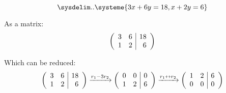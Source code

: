 \documentclass[12pt]{article}
\newenvironment{abc}{\begin{enumerate}[label={\bf(\alph*)}]}{\end{enumerate}}
\newcommand\m[2][]{
	\ifthenelse{\equal {#1} {}}
		{\begin{pmatrix*}[r]#2\end{pmatrix*}}
		{\left(\begin{array}{#1}#2\end{array}\right)}
}
\newcommand\resetequation[1][1]{\setcounter{equation}{#1 - 1}}
\begin{document}
\begin{abc}
	\begin{item}
	\resetequation
	\begin{equation}
		\sysdelim..\systeme{3x + 6y = 18, x + 2y = 6}
	\end{equation}
	\end{item}

	As a matrix:
	\begin{equation}
		\m[rr|r]{3 & 6 & 18 \\ 1 & 2 & 6}
	\end{equation}

	Which can be reduced:
	\begin{equation}
		\m[rr|r]{3 & 6 & 18 \\ 1 & 2 & 6}
		\xrightarrow{r_1 - 3r_2}
		\m[rr|r]{0 & 0 & 0 \\ 1 & 2 & 6}
		\xrightarrow{r_1 \leftrightarrow r_2}
		\m[rr|r]{1 & 2 & 6 \\ 0 & 0 & 0}
	\end{equation}
\end{abc}
\end{document}

